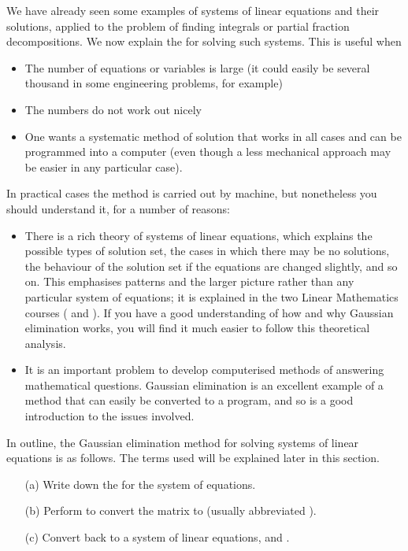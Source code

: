\documentclass[a4paper]{book}
\theoremstyle{definition}
\begin{document}
We have already seen some examples of systems of linear equations and
their solutions, applied to the problem of finding integrals or
partial fraction decompositions.  We now explain the  for solving such systems.  This is useful when
\begin{itemize}
 \item The number of equations or variables is large (it could easily
  be several thousand in some engineering problems, for example)
 \item The numbers do not work out nicely
 \item One wants a systematic method of solution that works in all
  cases and can be programmed into a computer (even though a less
  mechanical approach may be easier in any particular case).
\end{itemize}
In practical cases the method is carried out by machine, but
nonetheless you should understand it, for a number of reasons:
\begin{itemize}
 \item There is a rich theory of systems of linear equations, which
  explains the possible types of solution set, the cases in which there
  may be no solutions, the behaviour of the solution set if the
  equations are changed slightly, and so on.  This emphasises patterns
  and the larger picture rather than any particular system of
  equations; it is explained in the two Linear Mathematics courses
  ( and ).  If you have a good understanding of how
  and why Gaussian elimination works, you will find it much easier to
  follow this theoretical analysis.
 \item It is an important problem to develop computerised methods of
  answering mathematical questions.  Gaussian elimination is an
  excellent example of a method that can easily be converted to a
  program, and so is a good introduction to the issues involved.
\end{itemize}

In outline, the Gaussian elimination method for solving systems of
linear equations is as follows.  The terms used will be explained
later in this section.
\begin{itemize}
 \item[(a)] Write down the  for the system of
  equations.
 \item[(b)] Perform  to convert the matrix to
   (usually abbreviated ).
 \item[(c)] Convert back to a system of linear equations, and 
  . 
\end{itemize}
\end{document}
